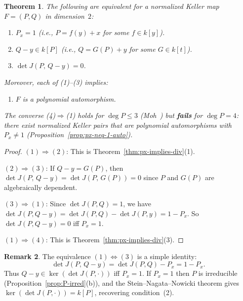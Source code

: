 \documentclass[12pt,a4paper]{article}
\newtheorem{theorem}{Theorem}[section]
\theoremstyle{definition}
\newtheorem{remark}[theorem]{Remark}
\newcommand{\kk}{k}
\begin{document}
\begin{theorem}\label{thm:equivalence}
The following are equivalent for a normalized Keller map $F = (P,Q)$ in
dimension~$2$:
\begin{enumerate}
\item $P_x = 1$ (i.e., $P = f(y) + x$ for some $f \in \kk[y]$).
\item $Q - y \in \kk[P]$ (i.e., $Q = G(P) + y$ for some $G \in \kk[t]$).
\item $\det J(P,\, Q - y) = 0$.
\end{enumerate}
Moreover, each of \textup{(1)--(3)} implies:
\begin{enumerate}
\item[\textup{(4)}] $F$ is a polynomial automorphism.
\end{enumerate}
The converse \textup{(4)}$\Rightarrow$\textup{(1)} holds for
$\deg P \leq 3$ \textup{(Moh~\cite{Moh})} but \textbf{fails} for
$\deg P = 4$: there exist normalized Keller pairs that are polynomial
automorphisms with $P_x \neq 1$
\textup{(Proposition~\ref{prop:px-neq-1-auto})}.
\end{theorem}

\begin{proof}
$(1) \Rightarrow (2)$: This is Theorem~\ref{thm:px-implies-div}(1).

$(2) \Rightarrow (3)$: If $Q - y = G(P)$, then
$\det J(P,\, Q-y) = \det J(P,\, G(P)) = 0$
since $P$ and $G(P)$ are algebraically dependent.

$(3) \Rightarrow (1)$: Since $\det J(P, Q) = 1$, we have
$\det J(P, Q-y) = \det J(P,Q) - \det J(P,y) = 1 - P_x$.
So $\det J(P, Q-y) = 0$ iff $P_x = 1$.

$(1) \Rightarrow (4)$: This is Theorem~\ref{thm:px-implies-div}(3).
\end{proof}

\begin{remark}
The equivalence $(1) \Leftrightarrow (3)$ is a simple identity:
\[
  \det J(P,\, Q - y) = \det J(P,Q) - P_x = 1 - P_x.
\]
Thus $Q - y \in \ker(\det J(P, \cdot))$ iff $P_x = 1$.
If $P_x = 1$ then $P$ is irreducible (Proposition~\ref{prop:P-irred}(b)),
and the Stein--Nagata--Nowicki theorem gives
$\ker(\det J(P, \cdot)) = \kk[P]$, recovering condition~(2).
\end{remark}
\end{document}
